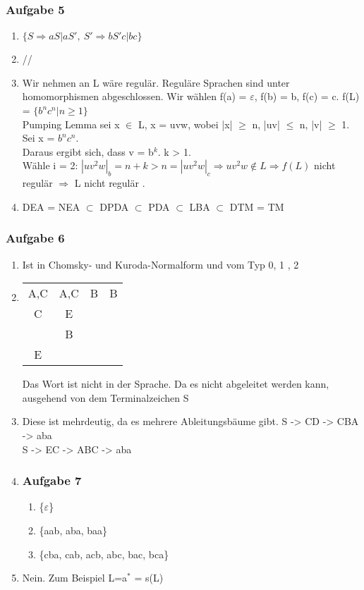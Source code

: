\documentclass[12pt]{scrartcl}
\begin{document}
\subsubsection{Aufgabe 5}
	\begin{enumerate}	
		\item \(\{S \Rightarrow aS|aS',\ S' \Rightarrow bS'c|bc \}\)
		\item //
		\item Wir nehmen an L wäre regulär. Reguläre Sprachen sind unter homomorphismen abgeschlossen. Wir wählen f(a) = $\varepsilon$, f(b) = b, f(c) = c. f(L) = \(\{b^{n}c^{n} | n \ge 1\}\)\\ 
		Pumping Lemma sei x $\in$ L, x = uvw, wobei |x| $\ge$ n, |uv| $\le$ n, |v| $\ge$ 1. Sei x = \(b^{n}c^{n}\). \\
		Daraus ergibt sich, dass v = b$^{k}$. k > 1. \\
		Wähle i = 2: \(|uv^{2}w|_b = n + k > n = |uv^{2}w|_c \Rightarrow uv^{2}w \notin L \Rightarrow f(L) \) nicht regulär $\Rightarrow$ L nicht regulär .
		\item DEA = NEA $\subset$ DPDA $\subset$ PDA $\subset$ LBA $\subset$ DTM = TM
		\end{enumerate} 

\subsubsection{Aufgabe 6}
	\begin{enumerate}	
		\item Ist in Chomsky- und Kuroda-Normalform und vom Typ 0, 1 , 2 
		\item 
			\begin{table}[!h]	
			\centering
 			 \begin{tabular}{|c|c|c|c|}
 			 	 \cline{1-4}
     			 A,C & A,C & B & B \\ \cline{1-4}
     			 C & E &   \\ \cline{1-3}
     			  & B\\ \cline{1-2}
     			 E\\ \cline{1-1}
			\end{tabular}	
			\end{table} 
			Das Wort ist nicht in der Sprache. Da es nicht abgeleitet werden kann, ausgehend von dem Terminalzeichen S 
		\item Diese ist mehrdeutig, da es mehrere Ableitungsbäume gibt. S -> CD -> CBA -> aba \\
		S -> EC -> ABC -> aba
		\item 
	
\subsubsection{Aufgabe 7}
	\begin{enumerate}
			\item \{$\varepsilon$\}
			\item \{aab, aba, baa\}
			\item \{cba, cab, acb, abc, bac, bca\}
		\end{enumerate}
		\item Nein. Zum Beispiel L=a$^{*}$ = s(L)
	\end{enumerate}
	
\end{document}
